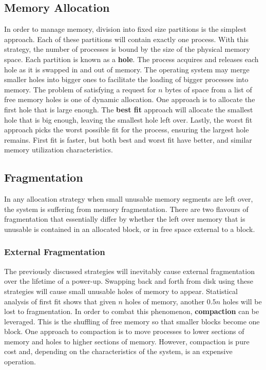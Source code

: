 \documentclass[10pt,a4paper]{article}
\begin{document}
\subsection{Memory Allocation}
In order to manage memory, division into fixed size partitions is the simplest approach. Each of these partitions will contain exactly one process. With this strategy, the number of processes is bound by the size of the physical memory space. Each partition is known as a {\bf hole}. The process acquires and releases each hole as it is swapped in and out of memory. The operating system may merge smaller holes into bigger ones to facilitate the loading of bigger processes into memory. The problem of satisfying a request for $n$ bytes of space from a list of free memory holes is one of dynamic allocation. One approach is to allocate the first hole that is large enough. The {\bf best fit} approach will allocate the smallest hole that is big enough, leaving the smallest hole left over. Lastly, the worst fit approach picks the worst possible fit for the process, ensuring the largest hole remains. First fit is faster, but both best and worst fit have better, and similar memory utilization characteristics. 
\subsection{Fragmentation}
In any allocation strategy when small unusable memory segments are left over, the system is suffering from memory fragmentation. There are two flavours of fragmentation that essentially differ by whether the left over memory that is unusable is contained in an allocated block, or in free space external to a block. 
\subsubsection{External Fragmentation}
The previously discussed strategies will inevitably cause external fragmentation over the lifetime of a power-up. Swapping back and forth from disk using these strategies will cause small unusable holes of memory to appear. Statistical analysis of first fit shows that given $n$ holes of memory, another $0.5n$ holes will be lost to fragmentation. In order to combat this phenomenon, {\bf compaction} can be leveraged. This is the shuffling of free memory so that smaller blocks become one block. One approach to compaction is to move processes to lower sections of memory and holes to higher sections of memory. However, compaction is pure cost and, depending on the characteristics of the system, is an expensive operation. 
\end{document}
